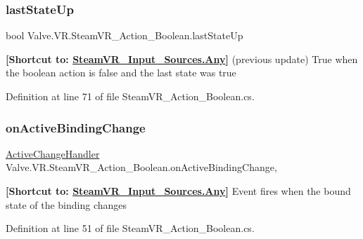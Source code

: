 \subsubsection{\texorpdfstring{lastStateUp}{lastStateUp}}
{\footnotesize\ttfamily bool Valve.\+V\+R.\+Steam\+V\+R\+\_\+\+Action\+\_\+\+Boolean.\+last\+State\+Up\hspace{0.3cm}{\ttfamily [get]}}



{\bfseries{\mbox{[}Shortcut to\+: \mbox{\hyperlink{namespace_valve_1_1_v_r_a82e5bf501cc3aa155444ee3f0662853faed36a1ef76a59ee3f15180e0441188ad}{Steam\+V\+R\+\_\+\+Input\+\_\+\+Sources.\+Any}}\mbox{]}}} (previous update) True when the boolean action is false and the last state was true 



Definition at line 71 of file Steam\+V\+R\+\_\+\+Action\+\_\+\+Boolean.\+cs.

\mbox{\label{class_valve_1_1_v_r_1_1_steam_v_r___action___boolean_a8037fe573d3db4ff82e02447d588b7f6}} 
\subsubsection{\texorpdfstring{onActiveBindingChange}{onActiveBindingChange}}
{\footnotesize\ttfamily \mbox{\hyperlink{class_valve_1_1_v_r_1_1_steam_v_r___action___boolean_af9f3044d5e4868485945b70d907c6bbb}{Active\+Change\+Handler}} Valve.\+V\+R.\+Steam\+V\+R\+\_\+\+Action\+\_\+\+Boolean.\+on\+Active\+Binding\+Change\hspace{0.3cm}{\ttfamily [add]}, {\ttfamily [remove]}}



{\bfseries{\mbox{[}Shortcut to\+: \mbox{\hyperlink{namespace_valve_1_1_v_r_a82e5bf501cc3aa155444ee3f0662853faed36a1ef76a59ee3f15180e0441188ad}{Steam\+V\+R\+\_\+\+Input\+\_\+\+Sources.\+Any}}\mbox{]}}} Event fires when the bound state of the binding changes 



Definition at line 51 of file Steam\+V\+R\+\_\+\+Action\+\_\+\+Boolean.\+cs.

\mbox{\label{class_valve_1_1_v_r_1_1_steam_v_r___action___boolean_a6a6a7e453cfd9ae522237e818304410e}} 
